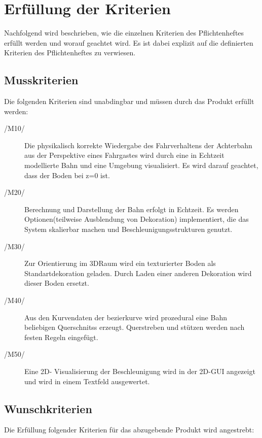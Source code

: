 \chapter{Erfüllung der Kriterien}

Nachfolgend wird beschrieben, wie die einzelnen Kriterien des Pflichtenheftes
erfüllt werden und worauf geachtet wird.  Es ist dabei explizit auf die
definierten Kriterien des Pflichtenheftes zu verwiesen.
\section{Musskriterien}

Die folgenden Kriterien sind unabdingbar und müssen durch das Produkt erfüllt
werden:
\begin{description}
	\item[/M10/] Die physikalisch korrekte Wiedergabe des Fahrverhaltens der Achterbahn aus der Perspektive eines Fahrgastes wird durch eine in Echtzeit modellierte Bahn und eine Umgebung visualisiert. Es wird darauf geachtet, dass der Boden bei z=0 ist.
	\item[/M20/] Berechnung und Darstellung der Bahn erfolgt in Echtzeit. Es werden Optionen(teilweise Ausblendung von Dekoration) implementiert, die das System skalierbar machen und Beschleunigungsstrukturen genutzt.
	\item[/M30/] Zur Orientierung im 3DRaum wird ein texturierter Boden als Standartdekoration geladen. Durch Laden einer anderen Dekoration wird dieser Boden ersetzt.
	\item[/M40/] Aus den Kurvendaten der bezierkurve wird prozedural eine Bahn beliebigen Querschnitss erzeugt. Querstreben und stützen werden nach festen Regeln eingefügt.
	\item[/M50/] Eine 2D- Visualisierung der Beschleunigung wird in der 2D-GUI angezeigt und wird in einem Textfeld ausgewertet.
\end{description}

\section{Wunschkriterien}
Die Erfüllung folgender Kriterien für das abzugebende Produkt wird angestrebt:

